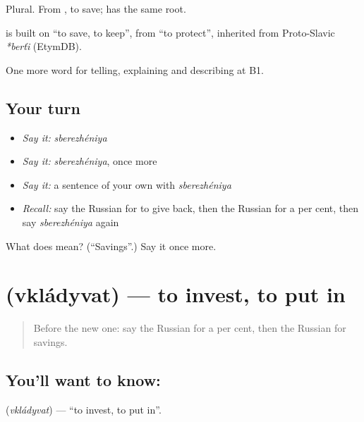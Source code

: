 Plural. From \emph{}, to save; \emph{} has the same root.

\begin{cousinweb}
\textbf{} is built on \emph{} \textquotedblleft{}to save, to keep\textquotedblright{}, from \emph{} \textquotedblleft{}to protect\textquotedblright{}, inherited from Proto-Slavic \emph{*berťi} (EtymDB).
\end{cousinweb}

\begin{grammarlens}[title={What you've built}]
One more word for telling, explaining and describing at B1.
\end{grammarlens}

\subsection*{Your turn}
\begin{itemize}
\raggedright
  \item \emph{Say it:} \emph{sberezhéniya}
  \item \emph{Say it:} \emph{sberezhéniya}, once more
  \item \emph{Say it:} a sentence of your own with \emph{sberezhéniya}
  \item \emph{Recall:} say the Russian for to give back, then the Russian for a per cent, then say \emph{sberezhéniya} again
\end{itemize}

\begin{tcolorbox}[breakable,colback=teal!4,colframe=teal!35!black,title={Before you move on}]
What does  mean? (\textquotedblleft{}Savings\textquotedblright{}.) Say it once more.
\end{tcolorbox}
\section[\texorpdfstring{\ru{вкладывать} (vkládyvat)}{вкладывать (vkládyvat)}]{ (vkládyvat) — to invest, to put in}

\label{lesson:RU-C395-vkladyvat}



\begin{quote}
Before the new one: say the Russian for a per cent, then the Russian for savings.
\end{quote}

\subsection*{You'll want to know: }
\textbf{} (\emph{vkládyvat}) — \textquotedblleft{}to invest, to put in\textquotedblright{}.

